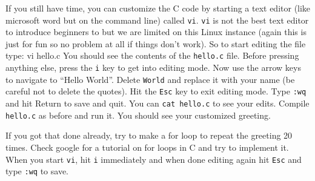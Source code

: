 \documentclass[12pt]{article}
\newenvironment{cmd}{\verbatim}{\endverbatim\vspace{3pt}}
\begin{document}
If you still have time, you can customize the C code by starting a text editor (like microsoft word but on the command line) called \texttt{vi}. \texttt{vi} is not the best text editor to introduce beginners to but we are limited on this Linux instance (again this is just for fun so no problem at all if things don't work). So to start editing the file type:
\begin{cmd}
  vi hello.c
\end{cmd}
You should see the contents of the \texttt{hello.c} file. Before pressing anything else, press the \texttt{i} key to get into editing mode. Now use the arrow keys to navigate to ``Hello World''. Delete \texttt{World} and replace it with your name (be careful not to delete the quotes). Hit the \texttt{Esc} key to exit editing mode. Type \texttt{:wq} and hit Return to save and quit. You can \texttt{cat hello.c} to see your edits. Compile \texttt{hello.c} as before and run it. You should see your customized greeting.
\vspace{1em}

If you got that done already, try to make a for loop to repeat the greeting 20 times. Check google for a tutorial on for loops in C and try to implement it. When you start \texttt{vi}, hit \texttt{i} immediately and when done editing again hit \texttt{Esc} and type \texttt{:wq} to save.
\end{document}
